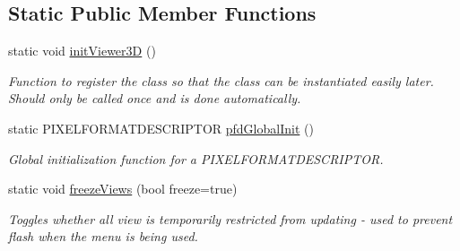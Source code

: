 \subsection*{Static Public Member Functions}
\begin{DoxyCompactItemize}
\item 
static void \hyperlink{class_viewer3_d_a78bda4bc2b56f9aa4d1e78019dbecaea}{initViewer3D} ()
\begin{DoxyCompactList}\small\item\em Function to register the class so that the class can be instantiated easily later. Should only be called once and is done automatically. \end{DoxyCompactList}\item 
static PIXELFORMATDESCRIPTOR \hyperlink{class_viewer3_d_acfb9f0fab5f383026f9d430e510c0bef}{pfdGlobalInit} ()
\begin{DoxyCompactList}\small\item\em Global initialization function for a PIXELFORMATDESCRIPTOR. \end{DoxyCompactList}\item 
static void \hyperlink{class_viewer3_d_addd4467c9919577f9e1895ab3961ec8c}{freezeViews} (bool freeze=true)
\begin{DoxyCompactList}\small\item\em Toggles whether all view is temporarily restricted from updating -\/ used to prevent flash when the menu is being used. \end{DoxyCompactList}\end{DoxyCompactItemize}
